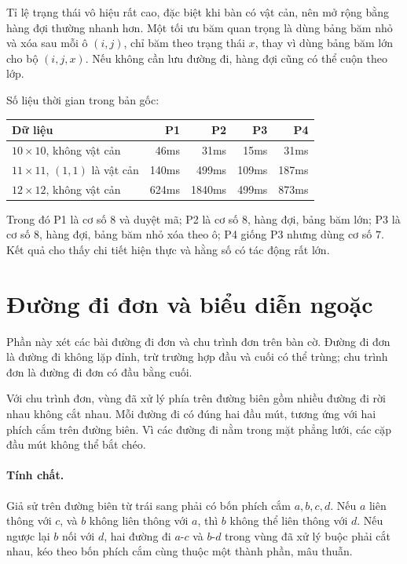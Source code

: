 \documentclass[11pt]{article}
\begin{document}
Tỉ lệ trạng thái vô hiệu rất cao, đặc biệt khi bàn có vật cản, nên mở rộng
bằng hàng đợi thường nhanh hơn. Một tối ưu băm quan trọng là dùng bảng băm nhỏ
và xóa sau mỗi ô \((i,j)\), chỉ băm theo trạng thái \(x\), thay vì dùng bảng
băm lớn cho bộ \((i,j,x)\). Nếu không cần lưu đường đi, hàng đợi cũng có thể
cuộn theo lớp.

Số liệu thời gian trong bản gốc:
\begin{center}
\small
\begin{tabular}{lrrrr}
\hline
Dữ liệu & P1 & P2 & P3 & P4 \\
\hline
\(10\times10\), không vật cản & 46ms & 31ms & 15ms & 31ms \\
\(11\times11\), \((1,1)\) là vật cản & 140ms & 499ms & 109ms & 187ms \\
\(12\times12\), không vật cản & 624ms & 1840ms & 499ms & 873ms \\
\hline
\end{tabular}
\end{center}
Trong đó P1 là cơ số \(8\) và duyệt mã; P2 là cơ số \(8\), hàng đợi, bảng băm
lớn; P3 là cơ số \(8\), hàng đợi, bảng băm nhỏ xóa theo ô; P4 giống P3 nhưng
dùng cơ số \(7\). Kết quả cho thấy chi tiết hiện thực và hằng số có tác động
rất lớn.

\section{Đường đi đơn và biểu diễn ngoặc}

Phần này xét các bài đường đi đơn và chu trình đơn trên bàn cờ. Đường đi đơn
là đường đi không lặp đỉnh, trừ trường hợp đầu và cuối có thể trùng; chu trình
đơn là đường đi đơn có đầu bằng cuối.

Với chu trình đơn, vùng đã xử lý phía trên đường biên gồm nhiều đường đi rời
nhau không cắt nhau. Mỗi đường đi có đúng hai đầu mút, tương ứng với hai phích
cắm trên đường biên. Vì các đường đi nằm trong mặt phẳng lưới, các cặp đầu mút
không thể bắt chéo.

\paragraph{Tính chất.}
Giả sử trên đường biên từ trái sang phải có bốn phích cắm \(a,b,c,d\). Nếu
\(a\) liên thông với \(c\), và \(b\) không liên thông với \(a\), thì \(b\)
không thể liên thông với \(d\). Nếu ngược lại \(b\) nối với \(d\), hai đường
đi \(a\)-\(c\) và \(b\)-\(d\) trong vùng đã xử lý buộc phải cắt nhau, kéo theo
bốn phích cắm cùng thuộc một thành phần, mâu thuẫn.
\end{document}
